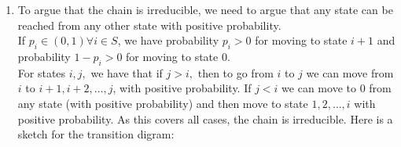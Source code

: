 \documentclass{Class}
\begin{document}
\begin{enumerate}
    \item To argue that the chain is irreducible, we need to argue that any state can be reached from any other state with positive probability.
    \\If $p_i\in(0,1)\forall i\in S$, we have probability $p_i>0$ for moving to state $i+1$ and probability $1-p_i>0$ for moving to state $0$.
    \\For states $i,j,$ we have that if $j>i,$ then to go from $i$ to $j$ we can move from $i$ to $i+1,i+2,\ldots, j$, with positive probability. If $j<i$ we can move to 0 from any state (with positive probability) and then move to state $1,2,\ldots, i$ with positive probability. As this covers all cases, the chain is irreducible. Here is a sketch for the transition digram:
    \begin{center}
\end{center}
\end{enumerate}
\end{document}
